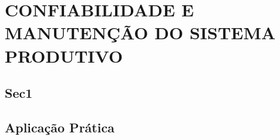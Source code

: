 \chapter{CONFIABILIDADE E MANUTENÇÃO DO SISTEMA PRODUTIVO}
\label{chap:confiabilidade_manutencao_do_sistema_produtivo}


\section{Sec1}
\label{sec:confiabilidade_manutencao_sec1}




\section{Aplicação Prática}
\label{sec:confiabilidade_manutencao_aplicacao}
